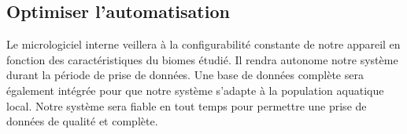 

\subsection{Optimiser l’automatisation}
\label{s:beo_obj_automat}

Le micrologiciel interne veillera à la configurabilité constante de notre appareil en fonction des caractéristiques du biomes étudié. Il rendra autonome notre système durant la période de prise de données. Une base de données complète sera également intégrée pour que notre système s’adapte à la population aquatique local. Notre système sera fiable en tout temps pour permettre une prise de données de qualité et complète. 
